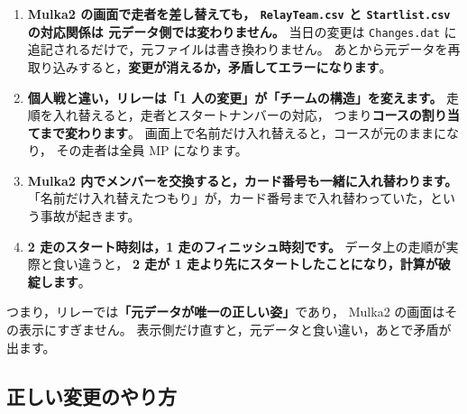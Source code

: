 \begin{enumerate}
\item \textbf{Mulka2 の画面で走者を差し替えても，
      \texttt{RelayTeam.csv} と \texttt{Startlist.csv} の対応関係は
      元データ側では変わりません。}
      当日の変更は \texttt{Changes.dat} に追記されるだけで，元ファイルは書き換わりません。
      あとから元データを再取り込みすると，\textbf{変更が消えるか，矛盾してエラーになります}。
\item \textbf{個人戦と違い，リレーは「1 人の変更」が「チームの構造」を変えます。}
      走順を入れ替えると，走者とスタートナンバーの対応，
      つまり\textbf{コースの割り当てまで変わります}。
      画面上で名前だけ入れ替えると，コースが元のままになり，
      その走者は全員 MP になります。
\item \textbf{Mulka2 内でメンバーを交換すると，カード番号も一緒に入れ替わります。}
      「名前だけ入れ替えたつもり」が，カード番号まで入れ替わっていた，という事故が起きます。
\item \textbf{2 走のスタート時刻は，1 走のフィニッシュ時刻です。}
      データ上の走順が実際と食い違うと，
      \textbf{2 走が 1 走より先にスタートしたことになり，計算が破綻します}。
\end{enumerate}

つまり，リレーでは\textbf{「元データが唯一の正しい姿」}であり，
Mulka2 の画面はその表示にすぎません。
表示側だけ直すと，元データと食い違い，あとで矛盾が出ます。

\subsection*{正しい変更のやり方}

